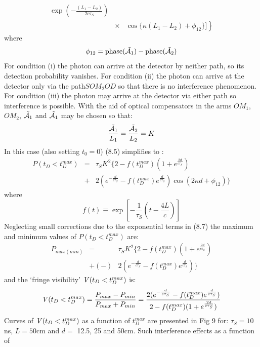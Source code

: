 \documentclass [12pt]{article}
\begin{document}
{\begin{eqnarray}
     \exp \left( -\frac{(L_1-L_2)}{2 c \tau_S}\right)
 \nonumber \\
 &\times & \left. \cos\{\kappa (L_1-L_2)+\phi_{12}\} ] \right\}
  \end{eqnarray}
    where
  \[ \phi_{12} = {\rm phase}(\tilde{{\cal A}_1}) - {\rm phase}(\tilde{{\cal A}_2}) \]
    For condition (i) the photon can arrive at the detector by neither path, so its detection
    probability vanishes. For condition (ii) the photon can arrive at the detector only
     via the path$SOM_2OD$ so that there is no interference phenomenon. For condition (iii) the photon
    may arrive at the detector via either path so interference is possible. 
    With the aid of optical compensators in the arms $OM_1$, $OM_2$, $\tilde{{\cal A}_1}$ and 
     $\tilde{{\cal A}_1}$ may be chosen so that:
    \begin{equation}
     \frac{\tilde{{\cal A}_1}}{L_1} =  \frac{\tilde{{\cal A}_2}}{L_2} = K
    \end{equation}
    In this case (also setting $t_0= 0$) (8.5) simplifies to :
    \begin{eqnarray}
     P(t_D < t_D^{max}) & = & \tau_S K^2\{ 2-f(t_D^{max})(1+ e^{\frac{2d}{c \tau_S}}) \nonumber \\
        & + & 2(e^{-\frac{d}{c \tau_S}}-f(t_D^{max})e^{\frac{d}{c \tau_S}})\cos(2 \kappa d + \phi_{12})\}
    \end{eqnarray}
     where 
  \[   f(t) \equiv \exp\left[ -\frac{1}{\tau_S}(t-\frac{4 L}{c}) \right] \]
    Neglecting small corrections due to the exponential terms in (8.7)  the maximum and minimum values of 
    $P(t_D < t_D^{max})$ are:
    \begin{eqnarray}
       P_{max(min)} & = & \tau_S K^2\{ 2-f(t_D^{max})(1+ e^{\frac{2d}{c \tau_S}}) \nonumber \\
        & +(-) &2( e^{-\frac{d}{c \tau_S}}-f(t_D^{max})e^{\frac{d}{c \tau_S}})\}
    \end{eqnarray}
     and the `fringe visibility' ${\it V}(t_D < t_D^{max})$ is:
     \begin{equation} 
  {\it V}(t_D < t_D^{max}) = \frac{ P_{max}- P_{min}}{ P_{max}+ P_{min}}
       = \frac{2( e^{-\frac{d}{c \tau_S}}-f(t_D^{max})e^{\frac{d}{c \tau_S}}) }
   {2-f(t_D^{max})(1+ e^{\frac{2d}{c \tau_S}})}
    \end{equation}
    Curves of ${\it V}(t_D < t_D^{max})$ as a function of $ t_D^{max}$ are presented in Fig 9 for:
    $\tau_S = 10$ns, $L = 50$cm and $d=$ 12.5, 25 and 50cm. Such interference effects as a function of
}
\end{document}
